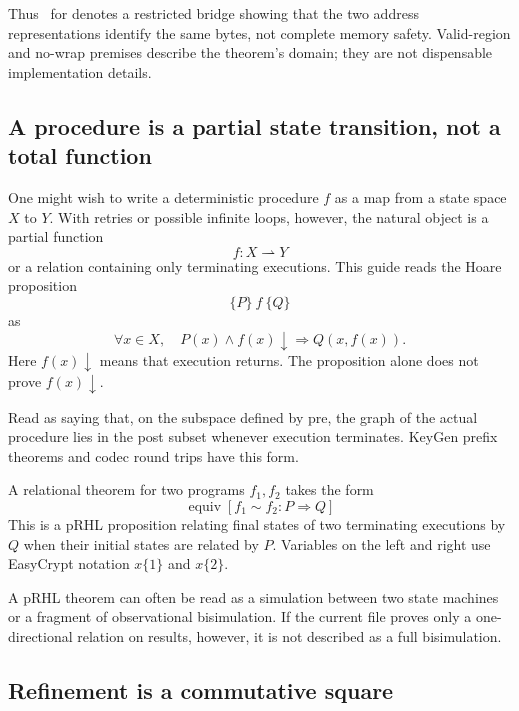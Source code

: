 Thus \statusproved\ for  denotes a restricted
bridge showing that the two address representations identify the same bytes,
not complete memory safety. Valid-region and no-wrap premises describe the
theorem's domain; they are not dispensable implementation details.

\subsection{A procedure is a partial state transition, not a total function}

One might wish to write a deterministic procedure \(f\) as a map from a state
space \(X\) to \(Y\). With retries or possible infinite loops, however, the
natural object is a partial function
\[
  f:X\rightharpoonup Y
\]
or a relation containing only terminating executions.
This guide reads the Hoare proposition
\[
  \{P\}\ f\ \{Q\}
\]
as
\[
  \forall x\in X,\quad
  P(x)\land f(x)\downarrow
  \Longrightarrow Q(x,f(x)).
\]
Here \(f(x)\downarrow\) means that execution returns.
The proposition alone does not prove \(f(x)\downarrow\).

\begin{translation}
Read  as saying that, on the subspace
defined by pre, the graph of the actual procedure lies in the post subset
whenever execution terminates. KeyGen prefix theorems and codec round trips
have this form.
\end{translation}

A relational theorem for two programs \(f_1,f_2\) takes the form
\[
  \operatorname{equiv}[f_1\sim f_2:P\Longrightarrow Q]
\]
This is a pRHL proposition relating final states of two terminating executions
by \(Q\) when their initial states are related by \(P\).
Variables on the left and right use EasyCrypt notation \(x\{1\}\) and \(x\{2\}\).

\begin{translation}
A pRHL theorem can often be read as a simulation between two state machines or
a fragment of observational bisimulation. If the current file proves only a
one-directional relation on results, however, it is not described as a full
bisimulation.
\end{translation}

\subsection{Refinement is a commutative square}

